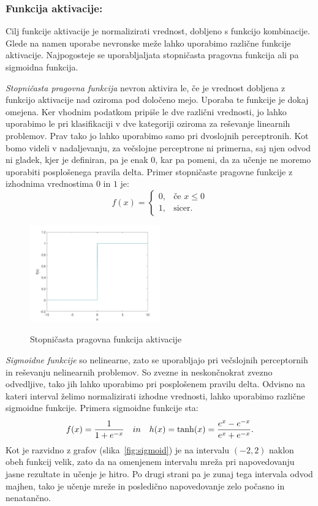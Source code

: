 \documentclass[mat1]{fmfdelo}
\begin{document}
\subsubsection{Funkcija aktivacije:}
Cilj funkcije aktivacije je normalizirati vrednost, dobljeno s funkcijo kombinacije. Glede na namen uporabe nevronske meže lahko uporabimo različne funkcije aktivacije. Najpogosteje se uporabljaljata stopničasta pragovna funkcija ali pa sigmoidna funkcija. 

\emph{Stopničasta pragovna funkcija} nevron aktivira le, če je vrednost dobljena z funkcijo aktivacije nad oziroma pod določeno mejo. Uporaba te funkcije je dokaj omejena. Ker vhodnim podatkom pripiše le dve različni vrednosti, jo lahko uporabimo le pri klasifikaciji v dve kategoriji oziroma za reševanje linearnih problemov. Prav tako jo lahko uporabimo samo pri dvoslojnih perceptronih. Kot bomo videli v nadaljevanju, za večslojne perceptrone ni primerna, saj njen odvod ni gladek, kjer je definiran, pa je enak $0$, kar pa pomeni, da za učenje ne moremo uporabiti posplošenega pravila delta. Primer stopničaste pragovne funkcije z izhodnima vrednostima $0$ in $1$ je:
%
\begin{equation*}
f(x)=
    \begin{cases}
      0, & \text{če } x  \leq 0 \\
      1, & \text{sicer.}
    \end{cases} 
\end{equation*}
%
\begin{figure}[!ht]
  \centering
    \includegraphics[width=0.5\textwidth]{step_fun.jpg}
  \label{fig:step}
 \caption{Stopničasta pragovna funkcija aktivacije}
\end{figure}

\emph{Sigmoidne funkcije} so nelinearne, zato se uporabljajo pri večslojnih perceptornih in reševanju nelinearnih problemov. So zvezne in neskončnokrat zvezno odvedljive, tako jih lahko uporabimo pri posplošenem pravilu delta. Odvisno na kateri interval želimo normalizirati izhodne vrednosti, lahko uporabimo različne sigmoidne funkcije. Primera sigmoidne funkcije sta: 
%
\begin{equation}
f(x) = \frac{1}{1+e^{-x}} \quad in \quad h(x) = \tanh(x) = \frac{e^x-e^{-x}}{e^x+e^{-x}} \text.
\end{equation}
%
Kot je razvidno z grafov (slika~\ref{fig:sigmoid}) je na intervalu $(-2,2)$ naklon obeh funkcij velik, zato da na omenjenem intervalu mreža pri napovedovanju jasne rezultate in učenje je hitro. Po drugi strani pa je zunaj tega intervala odvod majhen, tako je učenje mreže in posledično napovedovanje zelo počasno in nenatančno.
\end{document}

